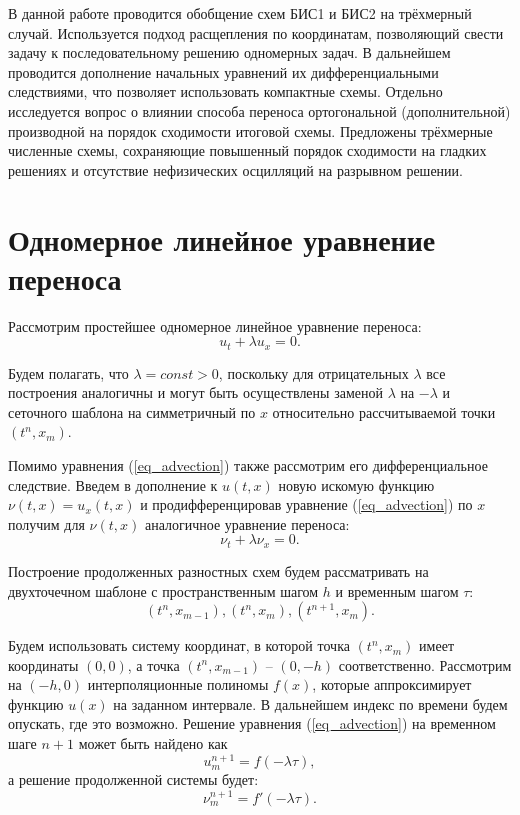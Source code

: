 \documentclass[11pt]{article}
\begin{document}
В данной работе проводится обобщение схем БИС1 и БИС2 на трёхмерный случай.
Используется подход расщепления по координатам, позволяющий свести задачу к последовательному решению одномерных задач.
В дальнейшем проводится дополнение начальных уравнений их дифференциальными следствиями, что позволяет использовать компактные схемы.
Отдельно исследуется вопрос о влиянии способа переноса ортогональной (дополнительной) производной на порядок сходимости итоговой схемы.
Предложены трёхмерные численные схемы, сохраняющие повышенный порядок сходимости на гладких решениях и отсутствие нефизических осцилляций на разрывном решении.

\section{Одномерное линейное уравнение переноса}

Рассмотрим простейшее одномерное линейное уравнение переноса:
\begin{equation}
\label{eq_advection}
u_t + \lambda u_x = 0.
\end{equation}

Будем полагать, что $\lambda = const > 0$,
поскольку для отрицательных $\lambda$ все построения аналогичны и могут быть осуществлены заменой $\lambda$ на $-\lambda$
и сеточного шаблона на симметричный по $x$ относительно рассчитываемой точки $(t^n, x_m)$.

Помимо уравнения (\ref{eq_advection}) также рассмотрим его дифференциальное следствие.
Введем в дополнение к $u(t, x)$ новую искомую функцию $\nu(t, x) = u_x(t, x)$ и продифференцировав уравнение (\ref{eq_advection}) по $x$
получим для $\nu(t, x)$ аналогичное уравнение переноса:
\begin{equation}
\label{eq_advection_ext}
\nu_t + \lambda \nu_x = 0.
\end{equation}

Построение продолженных разностных схем будем рассматривать на двухточечном шаблоне с пространственным шагом $h$ и временным шагом $\tau$:
\begin{equation}
\label{eq_stencil_3}
(t^n, x_{m-1}), (t^n, x_m), (t^{n+1}, x_m).
\end{equation}

Будем использовать систему координат, в которой точка $(t^n, x_m)$ имеет координаты $(0, 0)$,
а точка $(t^n, x_{m-1})$ -- $(0, -h)$ соответственно.
Рассмотрим на $(-h, 0)$ интерполяционные полиномы $f(x)$,
которые аппроксимирует функцию $u(x)$ на заданном интервале.
В дальнейшем индекс по времени будем опускать, где это возможно.
Решение уравнения (\ref{eq_advection}) на временном шаге $n+1$ может быть найдено как
$$
u^{n+1}_m = f(-\lambda\tau),
$$
а решение продолженной системы будет:
$$
\nu^{n+1}_m = f'(-\lambda\tau).
$$
\end{document}
